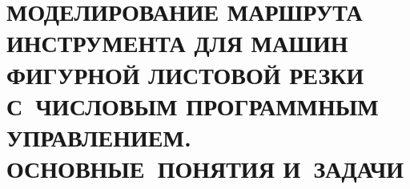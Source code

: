 

\chapter{
  МОДЕЛИРОВАНИЕ МАРШРУТА ИНСТРУМЕНТА ДЛЯ МАШИН ФИГУРНОЙ ЛИСТОВОЙ РЕЗКИ
  С~ЧИСЛОВЫМ ПРОГРАММНЫМ УПРАВЛЕНИЕМ.
  ОСНОВНЫЕ~ПОНЯТИЯ И~ЗАДАЧИ
}
\setcounter{chapter}{1}
\setcounter{equation}{0}





